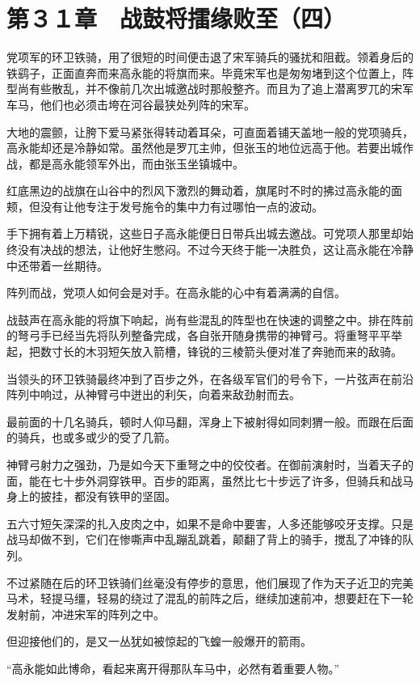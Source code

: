 \section{第３１章　战鼓将擂缘败至（四） }

党项军的环卫铁骑，用了很短的时间便击退了宋军骑兵的骚扰和阻截。领着身后的铁鹞子，正面直奔而来高永能的将旗而来。毕竟宋军也是匆匆堵到这个位置上，阵型尚有些散乱，并不像前几次出城邀战时那般整齐。而且为了追上潜离罗兀的宋军车马，他们也必须击垮在河谷最狭处列阵的宋军。

大地的震颤，让胯下爱马紧张得转动着耳朵，可直面着铺天盖地一般的党项骑兵，高永能却还是冷静如常。虽然他是罗兀主帅，但张玉的地位远高于他。若要出城作战，都是高永能领军外出，而由张玉坐镇城中。

红底黑边的战旗在山谷中的烈风下激烈的舞动着，旗尾时不时的拂过高永能的面颊，但没有让他专注于发号施令的集中力有过哪怕一点的波动。

手下拥有着上万精锐，这些日子高永能便日日带兵出城去邀战。可党项人那里却始终没有决战的想法，让他好生憋闷。不过今天终于能一决胜负，这让高永能在冷静中还带着一丝期待。

阵列而战，党项人如何会是对手。在高永能的心中有着满满的自信。

战鼓声在高永能的将旗下响起，尚有些混乱的阵型也在快速的调整之中。排在阵前的弩弓手已经当先将队列整备完成，各自张开随身携带的神臂弓。将重弩平平举起，把数寸长的木羽短矢放入箭槽，锋锐的三棱箭头便对准了奔驰而来的敌骑。

当领头的环卫铁骑最终冲到了百步之外，在各级军官们的号令下，一片弦声在前沿阵列中响过，从神臂弓中迸出的利矢，向着来敌劲射而去。

最前面的十几名骑兵，顿时人仰马翻，浑身上下被射得如同刺猬一般。而跟在后面的骑兵，也或多或少的受了几箭。

神臂弓射力之强劲，乃是如今天下重弩之中的佼佼者。在御前演射时，当着天子的面，能在七十步外洞穿铁甲。百步的距离，虽然比七十步远了许多，但骑兵和战马身上的披挂，都没有铁甲的坚固。

五六寸短矢深深的扎入皮肉之中，如果不是命中要害，人多还能够咬牙支撑。只是战马却做不到，它们在惨嘶声中乱蹦乱跳着，颠翻了背上的骑手，搅乱了冲锋的队列。

不过紧随在后的环卫铁骑们丝毫没有停步的意思，他们展现了作为天子近卫的完美马术，轻提马缰，轻易的绕过了混乱的前阵之后，继续加速前冲，想要赶在下一轮发射前，冲进宋军的阵列之中。

但迎接他们的，是又一丛犹如被惊起的飞蝗一般爆开的箭雨。

“高永能如此博命，看起来离开得那队车马中，必然有着重要人物。”

